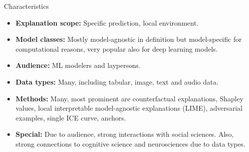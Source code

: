 \documentclass[aspectratio=169]{../latex_main/tntbeamer}  %
\begin{document}
\begin{frame}[c]{Characteristics}
	\begin{itemize}
		\item \textbf{Explanation scope:} Specific prediction, local environment.
		\pause\smallskip
		\item \textbf{Model classes:} Mostly model-agnostic in definition but model-specific for computational reasons, very popular also for deep learning models.
		\pause\smallskip
		\item \textbf{Audience:} ML modelers and laypersons.
		\pause\smallskip
		\item \textbf{Data types:} Many, including tabular, image, text and audio data.
		\pause\smallskip
		\item \textbf{Methods:} Many, most prominent are counterfactual explanations, Shapley values, local interpretable model-agnostic explanations (LIME), adversarial examples, single ICE curve, anchors.
		\pause\smallskip
		\item \textbf{Special:} Due to audience, strong interactions with social sciences. Also, strong connections to cognitive science and neurosciences due to data types.
	\end{itemize}
\end{frame}
\end{document}
